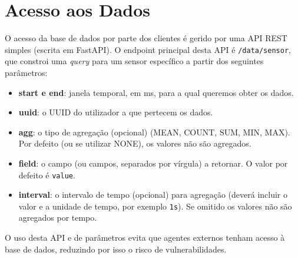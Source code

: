 \section{Acesso aos Dados}
\label{sec:rest_definition}

O acesso da base de dados por parte dos clientes é gerido por uma API REST simples (escrita em FastAPI). O endpoint principal desta API é \texttt{/data/{sensor}}, que constroi uma \textit{query} para um sensor específico a partir dos seguintes parâmetros:
\begin{itemize}
    \item \textbf{start e end}: janela temporal, em ms, para a qual queremos obter os dados.
    \item \textbf{uuid}: o \ac{UUID} do utilizador a que pertecem os dados.
    \item \textbf{agg}: o tipo de agregação (opcional) (MEAN, COUNT, SUM, MIN, MAX). Por defeito (ou se utilizar NONE), os valores não são agregados.
    \item \textbf{field}: o campo (ou campos, separados por vírgula) a retornar. O valor por defeito é \texttt{value}.
    \item \textbf{interval}: o intervalo de tempo (opcional) para agregação (deverá incluir o valor e a unidade de tempo, por exemplo \texttt{1s}). Se omitido os valores não são agregados por tempo.
\end{itemize}
O uso desta API e de parâmetros evita que agentes externos tenham acesso à base de dados, reduzindo por isso o risco de vulnerabilidades.